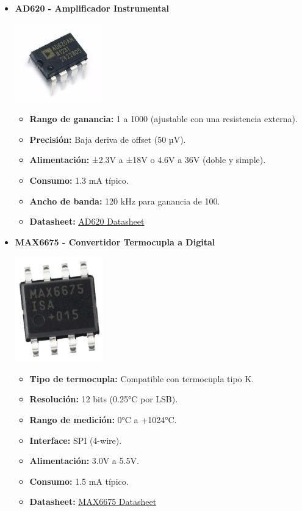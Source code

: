 \begin{itemize}
    \item \textbf{AD620 - Amplificador Instrumental} 
    \begin{center}
        \includegraphics[width=0.3\textwidth]{Imagenes/AD620 component.png}
    \end{center}
    \begin{itemize}
        \item \textbf{Rango de ganancia:} 1 a 1000 (ajustable con una resistencia externa).
        \item \textbf{Precisión:} Baja deriva de offset (50 µV).
        \item \textbf{Alimentación:} ±2.3V a ±18V o 4.6V a 36V (doble y simple).
        \item \textbf{Consumo:} 1.3 mA típico.
        \item \textbf{Ancho de banda:} 120 kHz para ganancia de 100.
        \item \textbf{Datasheet:} \href{https://www.analog.com/media/en/technical-documentation/data-sheets/AD620.pdf}{AD620 Datasheet}
    \end{itemize}

    \item \textbf{MAX6675 - Convertidor Termocupla a Digital} 
    \begin{center}
        \includegraphics[width=0.3\textwidth]{Imagenes/max6675 component.png}
    \end{center}
    \begin{itemize}
        \item \textbf{Tipo de termocupla:} Compatible con termocupla tipo K.
        \item \textbf{Resolución:} 12 bits (0.25°C por LSB).
        \item \textbf{Rango de medición:} 0°C a +1024°C.
        \item \textbf{Interface:} SPI (4-wire).
        \item \textbf{Alimentación:} 3.0V a 5.5V.
        \item \textbf{Consumo:} 1.5 mA típico.
        \item \textbf{Datasheet:} \href{https://datasheets.maximintegrated.com/en/ds/MAX6675.pdf}{MAX6675 Datasheet}
    \end{itemize}


\end{itemize}
